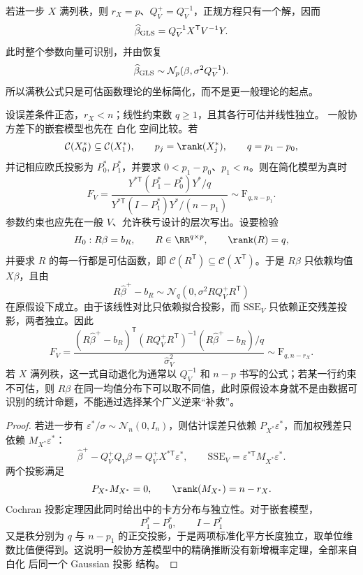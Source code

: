 若进一步 $X$ 满列秩，则 $r_X=p$、$Q_V^+=Q_V^{-1}$，正规方程只有一个解，因而
\begin{equation}\label{eq:math-stat-gls-beta}
 \widehat\beta_{\rm GLS}
 =Q_V^{-1}X^{\mathsf T}V^{-1}Y.
\end{equation}
此时整个参数向量可识别，并由恢复
\begin{equation*}\widehat\beta_{\rm GLS}
 \sim\mathcal N_p(\beta,\sigma^2Q_V^{-1}).
\end{equation*}
所以满秩公式只是可估函数理论的坐标简化，而不是更一般理论的起点。

\begin{theorem}[加权嵌套模型与可估线性约束的 F 检验]
设误差条件正态，$r_X<n$；线性约束数 $q\ge1$，且其各行可估并线性独立。
一般协方差下的嵌套模型也先在 白化 空间比较。若
\[
 \mathcal C(X_0^*)\subseteq\mathcal C(X_1^*),
 \qquad
 p_j=\rank(X_j^*),
 \qquad
 q=p_1-p_0,
\]
并记相应欧氏投影为 $P_0^*,P_1^*$，并要求 $0<p_1-p_0$、$p_1<n$。则在简化模型为真时
\begin{equation}\label{eq:math-stat-general-weighted-f}
 F_V
 =\frac{Y^{*\mathsf T}(P_1^*-P_0^*)Y^*/q}
 {Y^{*\mathsf T}(I-P_1^*)Y^*/(n-p_1)}
 \sim\mathrm F_{q,n-p_1}.
\end{equation}
参数约束也应先在一般 $V$、允许秩亏设计的层次写出。设要检验
\[
 H_0:R\beta=b_R,
 \qquad
 R\in\RR^{q\times p},
 \qquad
 \rank(R)=q,
\]
并要求 $R$ 的每一行都是可估函数，即 $\mathcal C(R^{\mathsf T})\subseteq\mathcal C(X^{\mathsf T})$。于是 $R\beta$ 只依赖均值 $X\beta$，且由
\[
 R\widehat\beta^+-b_R
 \sim\mathcal N_q\!\left(
 0,
 \sigma^2RQ_V^+R^{\mathsf T}
 \right)
\]
在原假设下成立。由于该线性对比只依赖拟合投影，而 $\mathrm{SSE}_V$ 只依赖正交残差投影，两者独立。因此
\begin{equation}\label{eq:math-stat-general-weighted-linear-hypothesis}
 F_V
 =\frac{
 (R\widehat\beta^+-b_R)^{\mathsf T}
 (RQ_V^+R^{\mathsf T})^{-1}
 (R\widehat\beta^+-b_R)/q
 }{\widehat\sigma_V^2}
 \sim\mathrm F_{q,n-r_X}.
\end{equation}
若 $X$ 满列秩，这一式自动退化为通常以 $Q_V^{-1}$ 和 $n-p$ 书写的公式；若某一行约束不可估，则 $R\beta$ 在同一均值分布下可以取不同值，此时原假设本身就不是由数据可识别的统计命题，不能通过选择某个广义逆来“补救”。
\end{theorem}

\begin{proof}
若进一步有 $\varepsilon^*/\sigma\sim\mathcal N_n(0,I_n)$，则估计误差只依赖 $P_{X^*}\varepsilon^*$，而加权残差只依赖 $M_{X^*}\varepsilon^*$：
\[
 \widehat\beta^+-Q_V^+Q_V\beta
 =Q_V^+X^{*\mathsf T}\varepsilon^*,
 \qquad
 \mathrm{SSE}_V
 =\varepsilon^{*\mathsf T}M_{X^*}\varepsilon^*.
\]
两个投影满足
\[
 P_{X^*}M_{X^*}=0,
 \qquad
 \rank(M_{X^*})=n-r_X.
\]
Cochran 投影定理因此同时给出中的卡方分布与独立性。对于嵌套模型，
\[
 P_1^*-P_0^*,
 \qquad
 I-P_1^*
\]
又是秩分别为 $q$ 与 $n-p_1$ 的正交投影，于是两项标准化平方长度独立，取单位维数比值便得到。这说明一般协方差模型中的精确推断没有新增概率定理，全部来自 白化 后同一个 Gaussian 投影 结构。
\end{proof}

